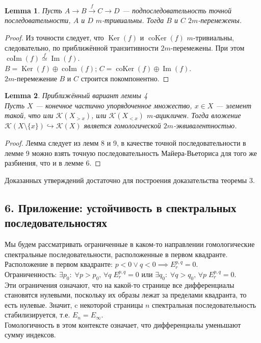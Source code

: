 \documentclass[a4paper, 12pt]{article}
\newtheorem{lemma}{Lemma}
\theoremstyle{definition}
\theoremstyle{remark}
\begin{document}
\begin{lemma}
  Пусть $A \to B \xrightarrow{f} C \to D$ --- подпоследовательность точной последовательности, $A$ и $D$ $m$-тривиальны. Тогда $B$ и $C$ $2m$-перемежены.
\end{lemma}
\begin{proof}
  Из точности следует, что $\operatorname{Ker}(f)$ и $\operatorname{coKer}(f)$ $m$-тривиальны, следовательно, по приближённой транзитивности $2m$-перемежены. При этом $\operatorname{coIm}(f) \stackrel{f}{\simeq} \operatorname{Im}(f)$.\\
  $B = \operatorname{Ker}(f) \oplus \operatorname{coIm}(f)$; $C = \operatorname{coKer}(f) \oplus \operatorname{Im}(f)$.\\
  $2m$-перемежение $B$ и $C$ строится покомпонентно.
\end{proof}

\begin{lemma}
  \textit{Приближённый вариант леммы 4}\\
  Пусть $X$ --- конечное частично упорядоченное множество, $x \in X$ --- элемент такой, что или $\mathcal{K}(X_{>x})$, или $\mathcal{K}(X_{<x})$ $m$-ацикличен. Тогда вложение $\mathcal{K}(X\setminus \{x\}) \hookrightarrow \mathcal{K}(X)$ является гомологической $2m$-эквивалентностью.
\end{lemma}
\begin{proof}
  Лемма следует из лемм 8 и 9, в качестве точной последовательности в лемме 9 можно взять точную последовательность Майера-Вьеториса для того же разбиения, что и в лемме 6.
\end{proof}

Доказанных утверждений достаточно для построения доказательства теоремы 3.

\subsection*{6. Приложение: устойчивость в спектральных последовательностях}
Мы будем рассматривать ограниченные в каком-то направлении гомологические спектральные последовательности, расположенные в первом квадранте.\\
Расположение в первом квадранте: $p < 0 \lor q < 0 \implies E_r^{p,q} = 0$.\\
Ограниченность: $\exists p_0:\;\forall p>p_0,\,\forall q\; E_r^{p,q} = 0$ или $\exists q_0:\;\forall q>q_0,\,\forall p\; E_r^{p,q} = 0$.\\
Эти ограничения означают, что на какой-то странице все дифференциалы становятся нулевыми, поскольку их образы лежат за пределами квадранта, то есть нулевые. Значит, c некоторой страницы $n$ спектральная последовательность стабилизируется, т.е. $E_n = E_{\infty}$.\\
Гомологичность в этом контексте означает, что дифференциалы уменьшают сумму индексов.\\
\end{document}
